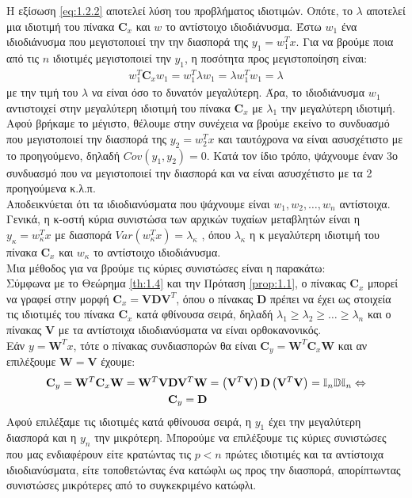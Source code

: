 Η εξίσωση \eqref{eq:1.2.2} αποτελεί λύση του προβλήματος ιδιοτιμών. Οπότε, το $λ$ αποτελεί μια ιδιοτιμή του πίνακα \en $\mathbf{C}_x$ \gr και \en $w$ \gr το αντίστοιχο ιδιοδιάνυσμα. Έστω \en$w_1$ \gr ένα ιδιοδιάνυσμα που μεγιστοποιεί την την διασπορά της \en$y_1 = w_1^T x$. Για να βρούμε ποια από τις \en $n$ \gr ιδιοτιμές μεγιστοποιεί την \en $y_1$, \gr η ποσότητα προς μεγιστοποίηση είναι:
\begin{align*}
    w_1^T \mathbf{C}_x w_1 = w_1^T \lambda w_1 = \lambda w_1^T w_1 = \lambda 
\end{align*}
\gr με την τιμή του $λ$ να είναι όσο το δυνατόν μεγαλύτερη. Άρα, το ιδιοδιάνυσμα \en$w_1$ \gr αντιστοιχεί στην μεγαλύτερη ιδιοτιμή του πίνακα \en$\mathbf{C}_x$ \gr με $λ_1$ την μεγαλύτερη ιδιοτιμή.
\\
Αφού βρήκαμε το μέγιστο, θέλουμε στην συνέχεια να βρούμε εκείνο το συνδυασμό που μεγιστοποιεί την διασπορά της \en$y_2 = w_2^T x$ και ταυτόχρονα να είναι ασυσχέτιστο με το προηγούμενο, δηλαδή \en $Cov(y_1,y_2) = 0$. \gr Κατά τον ίδιο τρόπο, ψάχνουμε έναν 3ο  συνδυασμό που να μεγιστοποιεί την διασπορά και να είναι ασυσχέτιστο με τα 2 προηγούμενα κ.λ.π. 
\\ [0.5\baselineskip]
Αποδεικνύεται ότι τα ιδιοδιανύσματα που ψάχνουμε είναι \en$ w_1 , w_2 , \ldots , w_n$ \gr αντίστοιχα. Γενικά, η κ-οστή κύρια συνιστώσα των αρχικών τυχαίων μεταβλητών είναι η \en$y_\kappa = w_{\kappa}^T x$ \gr με διασπορά \en$Var(w_{\kappa}^T x) = \lambda_{\kappa}$ \gr , όπου $λ_κ$ η κ μεγαλύτερη ιδιοτιμή του πίνακα \en$\mathbf{C}_x$ και \en$w_{\kappa} $ το αντίστοιχο ιδιοδιάνυσμα. 
\\[0.5\baselineskip]
Μια μέθοδος για να βρούμε τις κύριες συνιστώσες είναι η παρακάτω:\\
Σύμφωνα με το Θεώρημα \ref{th:1.4} και την Πρόταση \ref{prop:1.1}, ο πίνακας \en$\mathbf{C}_x$ \gr μπορεί να γραφεί στην μορφή \en$ \mathbf{C}_x = \mathbf{V} \mathbf{D} \mathbf{V}^T$, \gr όπου ο πίνακας \en $\mathbf{D}$ \gr πρέπει να έχει ως στοιχεία τις ιδιοτιμές του πίνακα \en $\mathbf{C}_x$ \gr κατά φθίνουσα σειρά, δηλαδή \en$\lambda_1 \geq \lambda_2 \geq \ldots \geq \lambda_n$ \gr και ο πίνακας \en$\mathbf{V}$ \gr με τα αντίστοιχα ιδιοδιανύσματα να είναι ορθοκανονικός.
\\
Εάν \en$ y = \mathbf{W}^T x $, \gr τότε ο πίνακας συνδιασπορών θα είναι \en$\mathbf{C}_y = \mathbf{W}^T \mathbf{C}_x \mathbf{W}$ \gr και αν επιλέξουμε \en$\mathbf{W} = \mathbf{V}$ \gr έχουμε:\en
\begin{align} \label{eq:1.2.3}
    \mathbf{C}_y = \mathbf{W}^T \mathbf{C}_x \mathbf{W} = \mathbf{W}^T  \mathbf{V} &\mathbf{D} \mathbf{V}^T \mathbf{W} = \left ( \mathbf{V}^T  \mathbf{V} \right ) \mathbf{D} \left ( \mathbf{V}^T \mathbf{V} \right ) =
    \mathbb{I}_n \mathbb{D} \mathbb{I}_n \Leftrightarrow \notag \\
    &\mathbf{C}_y = \mathbf{D}
\end{align}
\gr Αφού επιλέξαμε τις ιδιοτιμές κατά φθίνουσα σειρά, η \en $y_1$ \gr έχει την μεγαλύτερη διασπορά και η \en $y_n$ \gr την μικρότερη. Μπορούμε να επιλέξουμε τις κύριες συνιστώσες που μας ενδιαφέρουν είτε κρατώντας τις \en $p < n$ \gr πρώτες ιδιοτιμές και τα αντίστοιχα ιδιοδιανύσματα, είτε τοποθετώντας ένα κατώφλι ως προς την διασπορά, απορίπτωντας συνιστώσες μικρότερες από το συγκεκριμένο κατώφλι. 
